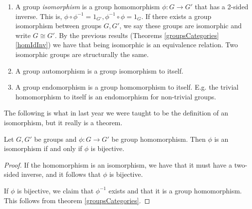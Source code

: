 \begin{definition}
  \begin{enumerate}
  
    \item A group \emph{isomorphism} is a group homomorphism $\phi:G\to G'$ that has a
      2-sided inverse. This is, $\phi\circ\phi^{-1}=1_{G'},\phi^{-1}\circ\phi=1_G$. If
      there exists a group isomorphism between groups $G,G'$, we say these groups are
      isomorphic and write $G\cong G'$. By the previous results (Theorems
      \ref{groupsCategories} \ref{homIdInv}) we have that being isomorphic is an
      equivalence relation. Two isomorphic groups are structurally the same.

    \item A group automorphism is a group isomorphism to itself.
    \item A group endomorphism is a group homomorphism to itself. E.g. the trivial
      homomorphism to itself is an endomorphism for non-trivial groups.
  \end{enumerate}
  \label{morphismZoo}
\end{definition}

The following is what in last year we were taught to be the definition of an isomorphism,
but it really is a theorem.
\begin{theorem}
  Let $G,G'$ be groups and $\phi:G\to G'$ be group homomorphism. Then $\phi$ is an
  isomorphism if and only if $\phi$ is bijective.
  \label{isomorphismBijective}
\end{theorem}
\begin{proof}
  If the homomorphism is an isomorphism, we have that it must have a two-sided inverse,
  and it follows that $\phi$ is bijective. 

  If $\phi$ is bijective, we claim that $\phi^{-1}$ exists and that it is a group
  homomorphism. This follows from theorem \ref{groupsCategories}.
\end{proof}
